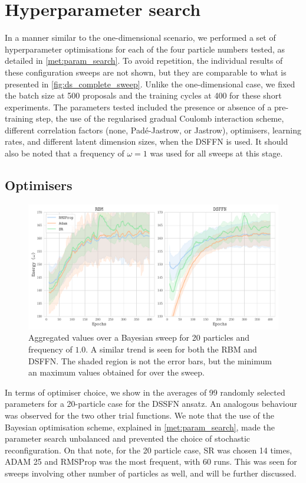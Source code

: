 \section{Hyperparameter search}\label{sec:parameter_search}

In a manner similar to the one-dimensional scenario, we performed a set of hyperparameter optimisations for each of the four particle numbers tested, as detailed in \ref{met:param_search}. To avoid repetition, the individual results of these configuration sweeps are not shown, but they are comparable to what is presented in \ref{fig:ds_complete_sweep}. Unlike the one-dimensional case, we fixed the batch size at 500 proposals and the training cycles at 400 for these short experiments. The parameters tested included the presence or absence of a pre-training step, the use of the regularised gradual Coulomb interaction scheme, different correlation factors (none, Padé-Jastrow, or Jastrow), optimisers, learning rates, and different latent dimension sizes, when the DSFFN is used. It should also be noted that a frequency of $\omega = 1$ was used for all sweeps at this stage.

\subsection{Optimisers}

\begin{figure}[H]
    \centering
    \includegraphics[width=0.9\linewidth]{Chapters/Results/dots/dsffn_vs_rbm_energy_20.pdf}
    \caption{Aggregated values over a Bayesian sweep for 20 particles and frequency of $1.0$. A similar trend is seen for both the RBM and DSFFN. The shaded region is not the error bars, but the minimum an maximum values obtained for over the sweep.}
    \label{fig:dsffn_vs_rbm_energy_20}
\end{figure}


In terms of optimiser choice, we show in  the averages of 99 randomly selected parameters for a 20-particle case for the DSSFN ansatz. An analogous behaviour was observed for the two other trial functions. We note that the use of the Bayesian optimisation scheme, explained in \ref{met:param_search}, made the parameter search unbalanced and prevented the choice of stochastic reconfiguration. On that note, for the 20 particle case, SR was chosen 14 times, ADAM 25 and RMSProp was the most frequent, with 60 runs. This was seen for sweeps involving other number of particles as well, and will be further discussed. 

